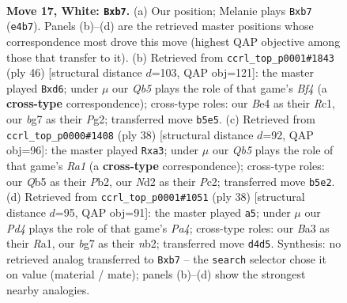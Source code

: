 \documentclass[11pt]{article}
\begin{document}
\clearpage

\begin{figure}[p]\centering
\begin{subfigure}{0.46\textwidth}\centering
\resizebox{\linewidth}{!}{%
\newchessgame
\chessboard[
  setfen={rnbq2kr/1p4b1/4p3/pQ4pp/3PB3/B7/P2N1PPP/R4RK1 w - - 4 17},
  showmover=false,
  pgfstyle=straightmove, color=movearrow, markmove={e4-b7}
]}
\caption{}
\end{subfigure}\hfill
\begin{subfigure}{0.46\textwidth}\centering
\resizebox{\linewidth}{!}{%
\newchessgame
\chessboard[
  setfen={rn1q1rk1/5pb1/3p2pp/1B3b2/pQ3B2/5N2/5PPP/2R1R1K1 w - - 0 24},
  showmover=false,
  pgfstyle=straightmove, color=movearrow, markmove={f4-d6}
]}
\caption{}
\end{subfigure}
\\[4pt]
\begin{subfigure}{0.46\textwidth}\centering
\resizebox{\linewidth}{!}{%
\newchessgame
\chessboard[
  setfen={r3kb1r/8/p1q1pppp/2p5/2Q5/p7/1PP2PPP/R1B2RK1 w kq - 0 20},
  showmover=false,
  pgfstyle=straightmove, color=movearrow, markmove={a1-a3}
]}
\caption{}
\end{subfigure}\hfill
\begin{subfigure}{0.46\textwidth}\centering
\resizebox{\linewidth}{!}{%
\newchessgame
\chessboard[
  setfen={r3k2r/3qb2p/p3p1p1/3pP3/Pp4Q1/4B3/1nB2PPP/R4RK1 w kq - 0 20},
  showmover=false,
  pgfstyle=straightmove, color=movearrow, markmove={a4-a5}
]}
\caption{}
\end{subfigure}
\caption{\textbf{Move 17, White: \texttt{Bxb7}.} (a) Our position; Melanie plays \texttt{Bxb7} (\texttt{e4b7}). Panels (b)--(d) are the retrieved master positions whose correspondence most drove this move (highest QAP objective among those that transfer to it). (b) Retrieved from \texttt{ccrl\_top\_p0001\#1843} (ply 46) [structural distance $d$=103, QAP obj=121]: the master played \texttt{Bxd6}; under $\mu$ our \emph{Qb5} plays the role of that game's \emph{Bf4} (a \textbf{cross-type} correspondence); cross-type roles: our \emph{B}e4 as their \emph{R}c1, our \emph{b}g7 as their \emph{P}g2; transferred move \texttt{b5e5}. (c) Retrieved from \texttt{ccrl\_top\_p0000\#1408} (ply 38) [structural distance $d$=92, QAP obj=96]: the master played \texttt{Rxa3}; under $\mu$ our \emph{Qb5} plays the role of that game's \emph{Ra1} (a \textbf{cross-type} correspondence); cross-type roles: our \emph{Q}b5 as their \emph{P}b2, our \emph{N}d2 as their \emph{P}c2; transferred move \texttt{b5e2}. (d) Retrieved from \texttt{ccrl\_top\_p0001\#1051} (ply 38) [structural distance $d$=95, QAP obj=91]: the master played \texttt{a5}; under $\mu$ our \emph{Pd4} plays the role of that game's \emph{Pa4}; cross-type roles: our \emph{B}a3 as their \emph{R}a1, our \emph{b}g7 as their \emph{n}b2; transferred move \texttt{d4d5}. Synthesis: no retrieved analog transferred to \texttt{Bxb7} -- the \texttt{search} selector chose it on value (material / mate); panels (b)--(d) show the strongest nearby analogies.}
\label{fig:thought-m32}
\end{figure}
\end{document}
